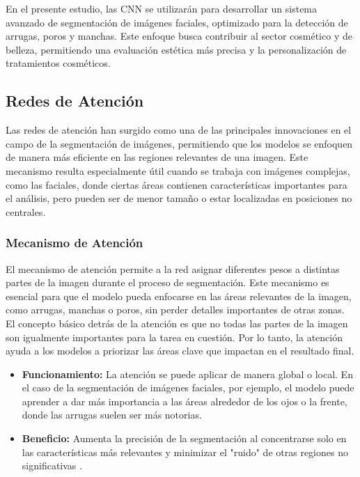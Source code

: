 En el presente estudio, las CNN se utilizarán para desarrollar un sistema avanzado de segmentación de imágenes faciales, optimizado para la detección de arrugas, poros y manchas. Este enfoque busca contribuir al sector cosmético y de belleza, permitiendo una evaluación estética más precisa y la personalización de tratamientos cosméticos.



\subsection{Redes de Atención}  
Las redes de atención han surgido como una de las principales innovaciones en el campo de la segmentación de imágenes, permitiendo que los modelos se enfoquen de manera más eficiente en las regiones relevantes de una imagen. Este mecanismo resulta especialmente útil cuando se trabaja con imágenes complejas, como las faciales, donde ciertas áreas contienen características importantes para el análisis, pero pueden ser de menor tamaño o estar localizadas en posiciones no centrales.

\subsubsection{Mecanismo de Atención}  
El mecanismo de atención permite a la red asignar diferentes pesos a distintas partes de la imagen durante el proceso de segmentación. Este mecanismo es esencial para que el modelo pueda enfocarse en las áreas relevantes de la imagen, como arrugas, manchas o poros, sin perder detalles importantes de otras zonas. El concepto básico detrás de la atención es que no todas las partes de la imagen son igualmente importantes para la tarea en cuestión. Por lo tanto, la atención ayuda a los modelos a priorizar las áreas clave que impactan en el resultado final.  
\begin{itemize}
    \item \textbf{Funcionamiento:} La atención se puede aplicar de manera global o local. En el caso de la segmentación de imágenes faciales, por ejemplo, el modelo puede aprender a dar más importancia a las áreas alrededor de los ojos o la frente, donde las arrugas suelen ser más notorias.
    \item \textbf{Beneficio:} Aumenta la precisión de la segmentación al concentrarse solo en las características más relevantes y minimizar el "ruido" de otras regiones no significativas \parencite{autor2021atencion}.
\end{itemize}


